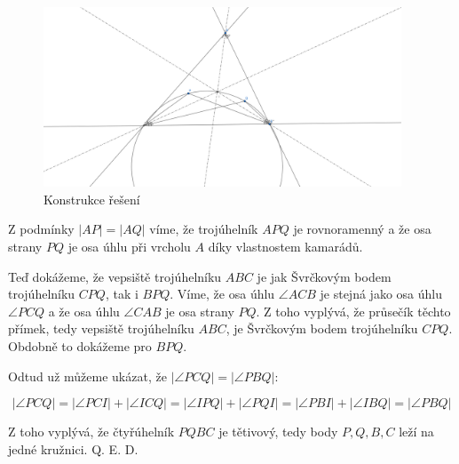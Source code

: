\documentclass{fkssolpub}
\author{Ondřej Sedláček}
\begin{document}
\begin{figure}
	\begin{center}
		\includegraphics[width=0.95\textwidth]{6-fig.png}
	\end{center}
	\caption{Konstrukce řešení}
	\label{fig:sol}
\end{figure}

Z podmínky $|AP| = |AQ|$ víme, že trojúhelník $APQ$ je rovnoramenný a že osa
strany $PQ$ je osa úhlu při vrcholu $A$ díky vlastnostem kamarádů.

Teď dokážeme, že vepsiště trojúhelníku $ABC$ je jak Švrčkovým bodem trojúhelníku
$CPQ$, tak i $BPQ$. Víme, že osa úhlu $\angle ACB$ je stejná jako osa úhlu
$\angle PCQ$ a že osa úhlu $\angle CAB$ je osa strany $PQ$. Z toho vyplývá,
že průsečík těchto přímek, tedy vepsiště trojúhelníku $ABC$, je Švrčkovým
bodem trojúhelníku $CPQ$. Obdobně to dokážeme pro $BPQ$.

Odtud už můžeme ukázat, že $|\angle PCQ| = |\angle PBQ|$:

\[
	|\angle PCQ| = |\angle PCI| + |\angle ICQ| = |\angle IPQ| + |\angle PQI|
	= |\angle PBI| + |\angle IBQ| = |\angle PBQ|
\]

Z toho vyplývá, že čtyřúhelník $PQBC$ je tětivový, tedy body $P, Q, B, C$
leží na jedné kružnici. Q. E. D.
\end{document}
